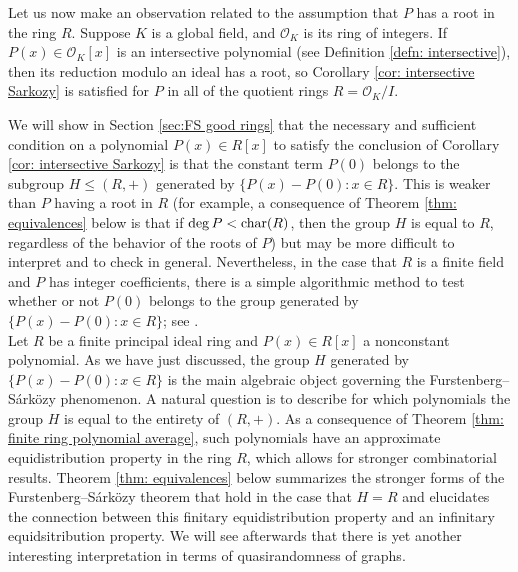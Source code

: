 \documentclass{amsart}
\theoremstyle{definition}
\numberwithin{equation}{section}
\newcommand{\mO}{\mathcal{O}}
\renewcommand{\char}{\textup{char}}
\begin{document}
Let us now make an observation related to the assumption that $P$ has a root in the ring $R$.
Suppose $K$ is a global field, and $\mO_K$ is its ring of integers.
If $P(x) \in \mO_K[x]$ is an intersective polynomial (see Definition \ref{defn: intersective}), then its reduction modulo an ideal has a root, so Corollary \ref{cor: intersective Sarkozy} is satisfied for $P$ in all of the quotient rings $R = \mO_K/I$.

We will show in Section \ref{sec:FS good rings} that the necessary and sufficient condition on a polynomial $P(x) \in R[x]$ to satisfy the conclusion of Corollary \ref{cor: intersective Sarkozy} is that the constant term $P(0)$ belongs to the subgroup $H \le (R,+)$ generated by $\{P(x) - P(0) : x \in R\}$.
This is weaker than $P$ having a root in $R$ (for example, a consequence of Theorem \ref{thm: equivalences} below is that if $\deg{P} < \char(R)$, then the group $H$ is equal to $R$, regardless of the behavior of the roots of $P$) but may be more difficult to interpret and to check in general.
Nevertheless, in the case that $R$ is a finite field and $P$ has integer coefficients, there is a simple algorithmic method to test whether or not $P(0)$ belongs to the group generated by $\{P(x) - P(0) : x \in R\}$; see \cite[Theorem 1.12]{ab_Sarkozy}. \\

Let $R$ be a finite principal ideal ring and $P(x) \in R[x]$ a nonconstant polynomial.
As we have just discussed, the group $H$ generated by $\{P(x) - P(0) : x \in R\}$ is the main algebraic object governing the Furstenberg--S\'{a}rk\"{o}zy phenomenon.
A natural question is to describe for which polynomials the group $H$ is equal to the entirety of $(R,+)$.
As a consequence of Theorem \ref{thm: finite ring polynomial average}, such polynomials have an approximate equidistribution property in the ring $R$, which allows for stronger combinatorial results.
Theorem \ref{thm: equivalences} below summarizes the stronger forms of the Furstenberg--S\'{a}rk\"{o}zy theorem that hold in the case that $H = R$ and elucidates the connection between this finitary equidistribution property and an infinitary equidsitribution property.
We will see afterwards that there is yet another interesting interpretation in terms of quasirandomness of graphs.
\end{document}

